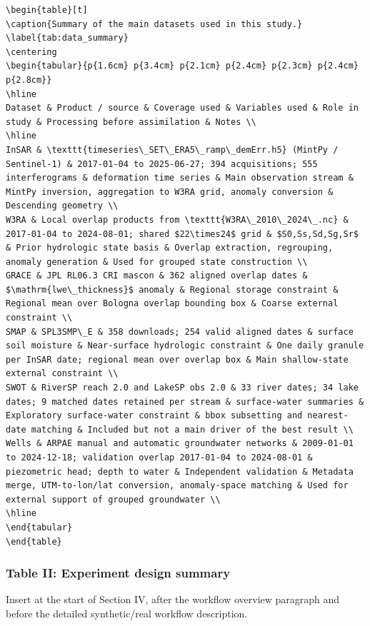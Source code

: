 \begin{verbatim}
\begin{table}[t]
\caption{Summary of the main datasets used in this study.}
\label{tab:data_summary}
\centering
\begin{tabular}{p{1.6cm} p{3.4cm} p{2.1cm} p{2.4cm} p{2.3cm} p{2.4cm} p{2.8cm}}
\hline
Dataset & Product / source & Coverage used & Variables used & Role in study & Processing before assimilation & Notes \\
\hline
InSAR & \texttt{timeseries\_SET\_ERA5\_ramp\_demErr.h5} (MintPy / Sentinel-1) & 2017-01-04 to 2025-06-27; 394 acquisitions; 555 interferograms & deformation time series & Main observation stream & MintPy inversion, aggregation to W3RA grid, anomaly conversion & Descending geometry \\
W3RA & Local overlap products from \texttt{W3RA\_2010\_2024\_.nc} & 2017-01-04 to 2024-08-01; shared $22\times24$ grid & $S0,Ss,Sd,Sg,Sr$ & Prior hydrologic state basis & Overlap extraction, regrouping, anomaly generation & Used for grouped state construction \\
GRACE & JPL RL06.3 CRI mascon & 362 aligned overlap dates & $\mathrm{lwe\_thickness}$ anomaly & Regional storage constraint & Regional mean over Bologna overlap bounding box & Coarse external constraint \\
SMAP & SPL3SMP\_E & 358 downloads; 254 valid aligned dates & surface soil moisture & Near-surface hydrologic constraint & One daily granule per InSAR date; regional mean over overlap box & Main shallow-state external constraint \\
SWOT & RiverSP reach 2.0 and LakeSP obs 2.0 & 33 river dates; 34 lake dates; 9 matched dates retained per stream & surface-water summaries & Exploratory surface-water constraint & bbox subsetting and nearest-date matching & Included but not a main driver of the best result \\
Wells & ARPAE manual and automatic groundwater networks & 2009-01-01 to 2024-12-18; validation overlap 2017-01-04 to 2024-08-01 & piezometric head; depth to water & Independent validation & Metadata merge, UTM-to-lon/lat conversion, anomaly-space matching & Used for external support of grouped groundwater \\
\hline
\end{tabular}
\end{table}
\end{verbatim}

\subsubsection*{Table II: Experiment design summary}
Insert at the start of Section IV, after the workflow overview paragraph and before the detailed synthetic/real workflow description.


